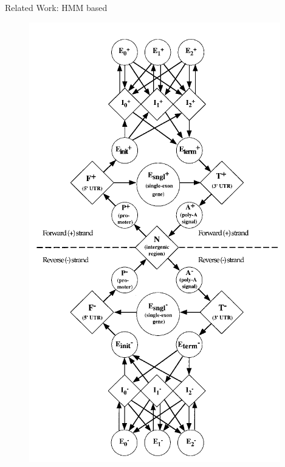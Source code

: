 \documentclass[11pt]{beamer}
\begin{document}
\begin{frame}{Related Work: HMM based}
\begin{figure}
\includegraphics[width=\textwidth,height=0.8\textheight,keepaspectratio]{hmm_implementation}
\end{figure}
\cite{burge1997prediction}
\end{frame}
\end{document}
